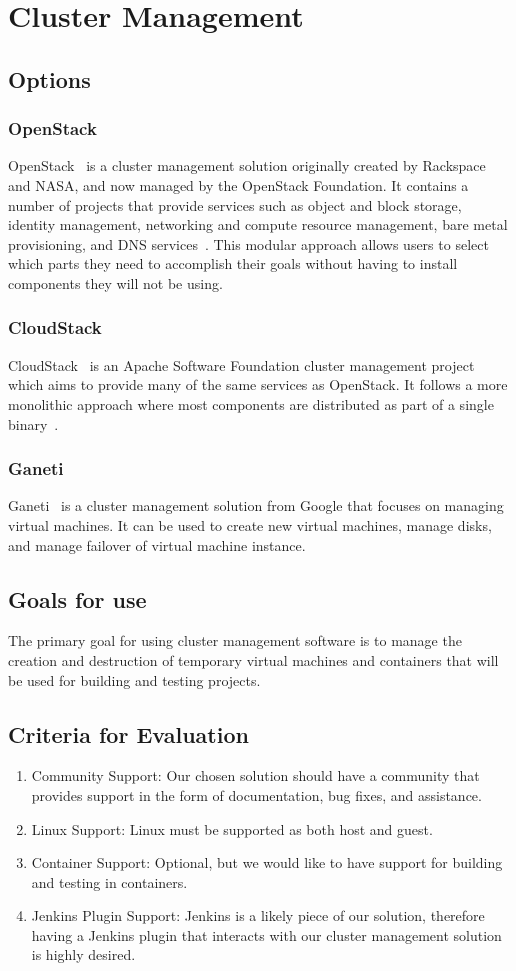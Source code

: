 \documentclass[10pt,letterpaper,onecolumn,journal]{IEEEtran}
\begin{document}
\section{Cluster Management}
\subsection{Options}
\subsubsection{OpenStack}
OpenStack~\cite{openstackmain} is a cluster management solution originally created by Rackspace and NASA, and now managed by the OpenStack Foundation.
It contains a number of projects that provide services such as object and block storage, identity management, networking and compute resource management, bare metal provisioning, and DNS services~\cite{openstackservices}.
This modular approach allows users to select which parts they need to accomplish their goals without having to install components they will not be using.
\subsubsection{CloudStack}
CloudStack~\cite{cloudstackmain} is an Apache Software Foundation cluster management project which aims to provide many of the same services as OpenStack.
It follows a more monolithic approach where most components are distributed as part of a single binary~\cite{cloudstackmono}.
\subsubsection{Ganeti}
Ganeti~\cite{ganetimain} is a cluster management solution from Google that focuses on managing virtual machines.
It can be used to create new virtual machines, manage disks, and manage failover of virtual machine instance.
\subsection{Goals for use}
The primary goal for using cluster management software is to manage the creation and destruction of temporary virtual machines and containers that will be used for building and testing projects.
\subsection{Criteria for Evaluation}
\begin{enumerate}
  \item Community Support: Our chosen solution should have a community that provides support in the form of documentation, bug fixes, and assistance.
  \item Linux Support: Linux must be supported as both host and guest.
  \item Container Support: Optional, but we would like to have support for building and testing in containers.
  \item Jenkins Plugin Support: Jenkins is a likely piece of our solution, therefore having a Jenkins plugin that interacts with our cluster management solution is highly desired.
\end{enumerate}
\end{document}
